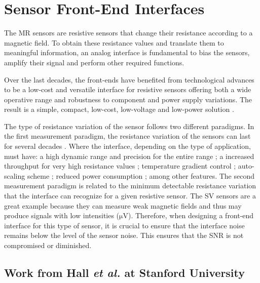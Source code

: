 \section{Sensor Front-End Interfaces}
\label{section:soa-interfaces}

The \ac{MR} sensors are resistive sensors that change their resistance according to a magnetic field. To obtain these resistance values and translate them to meaningful information, an analog interface is fundamental to bias the sensors, amplify their signal and perform other required functions.

Over the last decades, the front-ends have benefited from technological advances to be a low-cost and versatile interface for resistive sensors offering both a wide operative range and robustness to component and power supply variations. The result is a simple, compact, low-cost, low-voltage and low-power solution \cite{electronics8030263}.

The type of resistance variation of the sensor follows two different paradigms. In the first measurement paradigm, the resistance variation of the sensors can last for several decades \cite{5938039}. Where the interface, depending on the type of application, must have: a high dynamic range and precision for the entire range \cite{5938039, 1465853}; a increased throughput for very high resistance values \cite{4099747}; temperature gradient control \cite{4124708}; auto-scaling scheme \cite{4114752}; reduced power consumption \cite{6330702}; among other features. The second measurement paradigm is related to the minimum detectable resistance variation that the interface can recognize for a given resistive sensor. The \ac{SV} sensors are a great example because they can measure weak magnetic fields and thus may produce signals with low intensities ($\mathrm{\mu V}$). Therefore, when designing a front-end interface for this type of sensor, it is crucial to ensure that the interface noise remains below the level of the sensor noise. This ensures that the \ac{SNR} is not compromised or diminished.

\subsection{Work from Hall \textit{et al.} at Stanford University}

